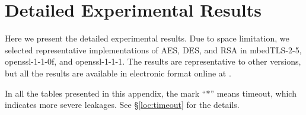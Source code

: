 
  
  
  

\newpage
\section{Detailed Experimental Results}
\label{sec:result-table}

Here we present the detailed experimental results.
Due to space limitation, we selected representative implementations of
AES, DES, and RSA in
mbedTLS-2-5, 
openssl-1-1-0f,  and
openssl-1-1-1.  
The results are representative to other versions, but all the results
are available in electronic format online at .

In all the tables presented in this appendix, the mark
``$*$'' means timeout, which indicates more severe leakages.
See \S\ref{loc:timeout} for the details.







